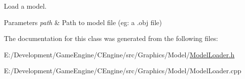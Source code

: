 Load a model. 


\begin{DoxyParams}{Parameters}
{\em path} & Path to model file (eg\+: a .obj file) \\
\hline
\end{DoxyParams}


The documentation for this class was generated from the following files\+:\begin{DoxyCompactItemize}
\item 
E\+:/\+Development/\+Game\+Engine/\+C\+Engine/src/\+Graphics/\+Model/\hyperlink{_model_loader_8h}{Model\+Loader.\+h}\item 
E\+:/\+Development/\+Game\+Engine/\+C\+Engine/src/\+Graphics/\+Model/Model\+Loader.\+cpp\end{DoxyCompactItemize}
